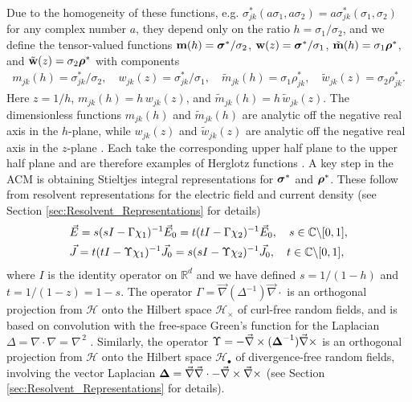 \documentclass{cmslatex}
\newcommand\bsig{\mbox{\boldmath${\sigma}$}}
\newcommand\brho{\mbox{\boldmath${\rho}$}}
\newcommand\bDelta{\mbox{\boldmath${\Delta}$}}
\begin{document}
Due to the homogeneity of these functions,
e.g. $\sigma_{jk}^*(a\sigma_1,a\sigma_2)=a\sigma_{jk}^*(\sigma_1,\sigma_2)$ for any complex number
$a$, they depend only on the ratio $h=\sigma_1/\sigma_2$, and we define the
tensor-valued functions $\mathbf{m}(h)=\bsig^*/\sigma_2$,
$\mathbf{w}(z)=\bsig^*/\sigma_1$, $\tilde{\mathbf{m}}(h)=\sigma_1\brho^*$, and
$\tilde{\mathbf{w}}(z)=\sigma_2\brho^*$ with components  
%
\begin{align}\label{eq:m_h}
  m_{jk}(h)=\sigma_{jk}^*/\sigma_2, \quad
  w_{jk}(z)=\sigma_{jk}^*/\sigma_1, \quad
   \tilde{m}_{jk}(h)=\sigma_1\rho_{jk}^*, \quad
   \tilde{w}_{jk}(z)=\sigma_2\rho_{jk}^*.
\end{align}
%
Here $z=1/h$, $m_{jk}(h)=h\,w_{jk}(z)$, and
$\tilde{m}_{jk}(h)=h\,\tilde{w}_{jk}(z)$. The
dimensionless functions $m_{jk}(h)$ and $\tilde{m}_{jk}(h)$ are analytic off
the negative real axis in the $h$-plane, while $w_{jk}(z)$ and
$\tilde{w}_{jk}(z)$ are analytic off the negative real axis in the
$z$-plane \cite{Golden:CMP-473}. Each take the corresponding upper
half plane to the upper half plane and are therefore examples of
Herglotz functions \cite{Deift:2000:RMT,Golden:CMP-473}. A key step in
the ACM is obtaining Stieltjes integral representations for $\bsig^*$
and $\brho^*$. These follow from resolvent representations for the
electric field \cite{Golden:CMP-473} and current density
\cite{Murphy:JMP:063506}  (see Section
\ref{sec:Resolvent_Representations} for details)       
%
\begin{align}\label{eq:Resolvent_representations_E_D}
  &\vec{E}=s(sI-\Gamma\chi_1)^{-1}\vec{E}_0=t(tI-\Gamma\chi_2)^{-1}\vec{E}_0 ,
  \quad
   s\in\mathbb{C}\backslash[0,1],\\
  &\vec{J}=t(tI-\Upsilon\chi_1)^{-1}\vec{J}_0=s(sI-\Upsilon\chi_2)^{-1}\vec{J}_0 ,
  \quad
   t\in\mathbb{C}\backslash[0,1],\notag 
\end{align}
%
where $I$ is the identity operator on $\mathbb{R}^d$ and we have
defined $s=1/(1-h)$ and $t=1/(1-z)=1-s$. The operator
$\Gamma=\vec{\nabla}(\Delta^{-1})\vec{\nabla}\cdot$ is an orthogonal projection from
$\mathscr{H}$ onto the Hilbert space $\mathscr{H}_\times$ of curl-free
random fields, and is based on convolution with the free-space Green's
function for the Laplacian $\Delta=\nabla\cdot\nabla=\nabla^{\,2}$ 
\cite{Golden:CMP-473,Murphy:JMP:063506}. Similarly, the operator
$\Upsilon=-\vec{\nabla}\times(\bDelta^{-1})\vec{\nabla}\times$ is an orthogonal projection from
$\mathscr{H}$ onto the Hilbert space $\mathscr{H}_\bullet$ of
divergence-free random fields, involving the vector Laplacian
$\bDelta=\vec{\nabla}\vec{\nabla}\cdot - \vec{\nabla}\times\vec{\nabla}\times$ (see Section
\ref{sec:Resolvent_Representations} for details).    
\end{document}
